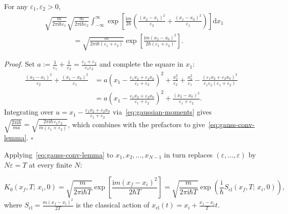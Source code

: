 \documentclass[11pt,a4paper]{article}
\newcommand{\ii}{\mathrm{i}}
\newcommand{\dd}{\mathrm{d}}
\newcommand{\xcl}{x_{\mathrm{cl}}}
\newcommand{\Scl}{S_{\mathrm{cl}}}
\begin{document}
\begin{propositionbox}
For any $\varepsilon_1, \varepsilon_2 > 0$,
\begin{equation}
\begin{aligned}
    &\sqrt{\frac{m}{2\pi\ii\hbar\varepsilon_1}}\sqrt{\frac{m}{2\pi\ii\hbar\varepsilon_2}}
    \int_{-\infty}^{\infty}
    \exp\!\left[\frac{\ii m}{2\hbar}\!\left(\frac{(x_2-x_1)^2}{\varepsilon_2}+\frac{(x_1-x_0)^2}{\varepsilon_1}\right)\right]\dd x_1 \\[3pt]
    &\qquad\qquad = \sqrt{\frac{m}{2\pi\ii\hbar(\varepsilon_1+\varepsilon_2)}}
      \exp\!\left[\frac{\ii m(x_2-x_0)^2}{2\hbar(\varepsilon_1+\varepsilon_2)}\right].
\end{aligned}
\label{eq:gauss-conv-lemma}
\end{equation}
\end{propositionbox}

\textit{Proof.}\;
Set $a := \frac{1}{\varepsilon_1} + \frac{1}{\varepsilon_2} = \frac{\varepsilon_1+\varepsilon_2}{\varepsilon_1\varepsilon_2}$ and complete the square in $x_1$:
\begin{align}
    \frac{(x_2-x_1)^2}{\varepsilon_2} + \frac{(x_1-x_0)^2}{\varepsilon_1}
    &= a\!\left(x_1 - \frac{\varepsilon_1 x_2 + \varepsilon_2 x_0}{\varepsilon_1+\varepsilon_2}\right)^2
       + \frac{x_2^2}{\varepsilon_2} + \frac{x_0^2}{\varepsilon_1}
       - \frac{(\varepsilon_1 x_2 + \varepsilon_2 x_0)^2}{\varepsilon_1\varepsilon_2(\varepsilon_1+\varepsilon_2)} \nonumber\\[3pt]
    &= a\!\left(x_1 - \frac{\varepsilon_1 x_2 + \varepsilon_2 x_0}{\varepsilon_1+\varepsilon_2}\right)^2
       + \frac{(x_2 - x_0)^2}{\varepsilon_1 + \varepsilon_2}.
\end{align}
Integrating over $u = x_1 - \frac{\varepsilon_1 x_2 + \varepsilon_2 x_0}{\varepsilon_1+\varepsilon_2}$ via~\eqref{eq:gaussian-moments} gives $\sqrt{\frac{2\pi\ii\hbar}{ma}} = \sqrt{\frac{2\pi\ii\hbar\,\varepsilon_1\varepsilon_2}{m(\varepsilon_1+\varepsilon_2)}}$, which combines with the prefactors to give~\eqref{eq:gauss-conv-lemma}. \hfill$\square$

Applying~\eqref{eq:gauss-conv-lemma} to $x_1, x_2, \dots, x_{N-1}$ in turn replaces $(\varepsilon,\dots,\varepsilon)$ by $N\varepsilon = T$ at every finite $N$:

\begin{theorembox}
\begin{equation}
    K_0(x_f,T;\,x_i,0)
    = \sqrt{\frac{m}{2\pi\ii\hbar T}}\exp\!\left[\frac{\ii m(x_f - x_i)^2}{2\hbar T}\right]
    = \sqrt{\frac{m}{2\pi\ii\hbar T}}\exp\!\left(\frac{\ii}{\hbar}\Scl(x_f,T;\,x_i,0)\right),
    \label{eq:free-propagator}
\end{equation}
where $\Scl = \frac{m(x_f-x_i)^2}{2T}$ is the classical action of $\xcl(t) = x_i + \frac{x_f-x_i}{T}t$.
\end{theorembox}
\end{document}
